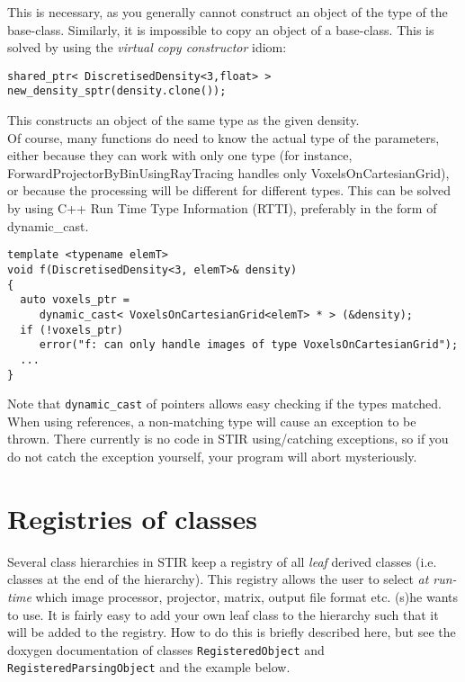 \documentclass{article}
\begin{document}
This is necessary, as you generally cannot construct an object 
of the type of the base-class. Similarly, it is impossible to 
copy an object of a base-class. This is solved by using the \textit{virtual 
copy constructor} idiom:

\begin{verbatim}
shared_ptr< DiscretisedDensity<3,float> > new_density_sptr(density.clone());
\end{verbatim}

This constructs an object of the same type as the given density.\\
Of course, many functions do need to know the actual type of 
the parameters, either because they can work with only one type 
(for instance, ForwardProjectorByBinUsingRayTracing handles only 
VoxelsOnCartesianGrid), or because the processing will be different 
for different types. This can be solved by using C++ Run Time 
Type Information (RTTI), preferably in the form of dynamic\_cast.

\begin{verbatim}
template <typename elemT> 
void f(DiscretisedDensity<3, elemT>& density)
{
  auto voxels_ptr =
     dynamic_cast< VoxelsOnCartesianGrid<elemT> * > (&density);
  if (!voxels_ptr)
     error("f: can only handle images of type VoxelsOnCartesianGrid");
  ...
}
\end{verbatim}


Note that \texttt{dynamic\_cast} of pointers allows easy checking if the 
types matched. When using references, a non-matching type will 
cause an exception to be thrown. There currently is no code in 
STIR using/catching exceptions, so if you do not catch the exception 
yourself, your program will abort mysteriously.


\section{
Registries of classes \label{sect:registries}}

Several class hierarchies in STIR keep a registry of all \textit{leaf} 
derived classes (i.e. classes at the end of the hierarchy). This 
registry allows the user to select \textit{at run-time} which image 
processor, projector, matrix, output file format etc. (s)he 
wants to use. It is fairly easy to add your own leaf class to 
the hierarchy such that it will be added to the registry. How 
to do this is briefly described here, but see the doxygen 
documentation of classes \texttt{RegisteredObject} and \texttt{RegisteredParsingObject}
and the example below. 
\end{document}
